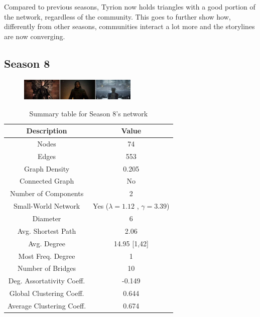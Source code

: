 \documentclass[10pt,twocolumn,letterpaper]{article}
\begin{document}
Compared to previous seasons, Tyrion now holds triangles with a good portion of the network, regardless of the community. This goes to further show how, differently from other seasons, communities interact a lot more and the storylines are now converging.


\subsection{Season 8}

\begin{figure}[!h]
    \centering
    \includegraphics[width=0.5\textwidth]{img/s8/s8_frames.jpg}
\end{figure}


\begin{table}[!h]
    \centering
    \small
    \begin{tabular}{c|c}
        Description & Value  \\
        \hline
        Nodes & 74\\
        Edges & 553 \\
        Graph Density & 0.205 \\
        Connected Graph & No \\
        Number of Components & 2 \\
        Small-World Network & Yes ($\lambda=1.12$ , $\gamma=3.39$) \\
        Diameter & 6 \\
        Avg. Shortest Path & 2.06 \\
        Avg. Degree & 14.95 [1,42] \\
        Most Freq. Degree & 1 \\
        Number of Bridges & 10 \\
        Deg. Assortativity Coeff. & -0.149\\
        Global Clustering Coeff. & 0.644 \\
        Average Clustering Coeff. & 0.674 \\
        \hline 
    \end{tabular}
    \vspace{0.2cm}
    \caption{Summary table for Season 8's network}
    \label{tab:my_label}
\end{table} 
\end{document}
